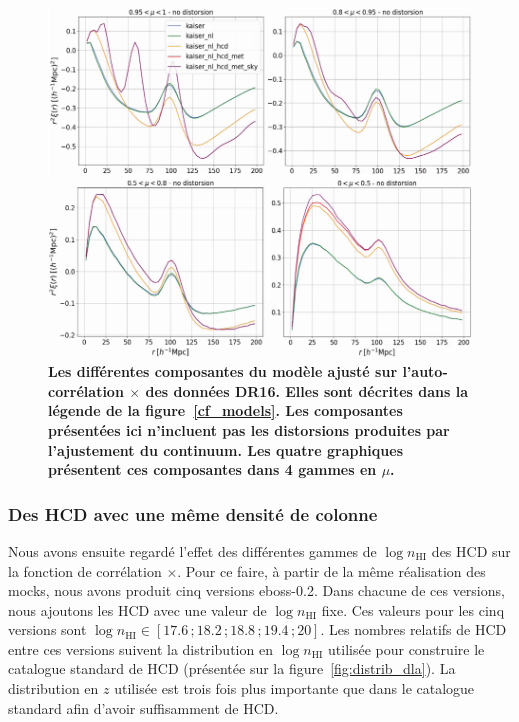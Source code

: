 \begin{figure}
  \centering
  \includegraphics[scale=0.5]{cf_models_no_dist}
  \caption{\textbf{Les différentes composantes du modèle ajusté sur l'auto-corrélation \lya{}$\times$\lya{} des données DR16. Elles sont décrites dans la légende de la figure~\ref{cf_models}.
    Les composantes présentées ici n'incluent pas les distorsions produites par l'ajustement du continuum.
    Les quatre graphiques présentent ces composantes dans 4 gammes en $\mu$.}}
  \label{fig:cf_models_no_dist}
\end{figure}



\subsubsection{Des HCD avec une même densité de colonne}
Nous avons ensuite regardé l'effet des différentes gammes de $\log n_{\mathrm{HI}}$ des HCD sur la fonction de corrélation \lya{}$\times$\lya{}.
Pour ce faire, à partir de la même réalisation des mocks, nous avons produit cinq versions eboss-0.2. Dans chacune de ces versions, nous ajoutons les HCD avec une valeur de $\log n_{\mathrm{HI}}$ fixe. Ces valeurs pour les cinq versions sont $\log n_{\mathrm{HI}} \in [\num{17.6}\,;\num{18.2}\,;\num{18.8}\,;\num{19.4}\,;\num{20}]$. Les nombres relatifs de HCD entre ces versions suivent la distribution en $\log n_{\mathrm{HI}}$ utilisée pour construire le catalogue standard de HCD (présentée sur la figure~\ref{fig:distrib_dla}). La distribution en $z$ utilisée est trois fois plus importante que dans le catalogue standard afin d'avoir suffisamment de HCD.

